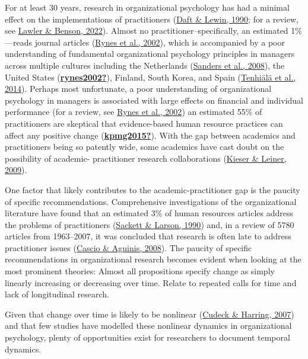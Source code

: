 \documentclass[
12pt, %
twoside,
english]{guelphthesis}
\begin{document}
For at least 30 years, research in organizational psychology has had a minimal effect on the implementations of practitioners (\protect\hyperlink{ref-daft1990}{Daft \& Lewin, 1990}; for a review, see \protect\hyperlink{ref-lawler2022}{Lawler \& Benson, 2022}). Almost no practitioner--specifically, an estimated 1\%---reads journal articles (\protect\hyperlink{ref-rynes2002a}{Rynes et al., 2002}), which is accompanied by a poor understanding of fundamental organizational psychology principles in managers across multiple cultures including the Netherlands (\protect\hyperlink{ref-sanders2008}{Sanders et al., 2008}), the United States (\protect\hyperlink{ref-rynes2002}{\textbf{rynes2002?}}), Finland, South Korea, and Spain (\protect\hyperlink{ref-tenhiuxe4luxe42014}{Tenhiälä et al., 2014}). Perhaps most unfortunate, a poor understanding of organizational psychology in managers is associated with large effects on financial and individual performance (for a review, see \protect\hyperlink{ref-rynes2002b}{Rynes et al., 2002}) an estimated 55\% of practitioners are skeptical that evidence-based human resource practices can affect any positive change (\protect\hyperlink{ref-kpmg2015}{\textbf{kpmg2015?}}). With the gap between academics and practitioners being so patently wide, some academics have cast doubt on the possibility of academic- practitioner research collaborations (\protect\hyperlink{ref-kieser2009}{Kieser \& Leiner, 2009}).

One factor that likely contributes to the academic-practitioner gap is the paucity of specific recommendations. Comprehensive investigations of the organizational literature have found that an estimated 3\% of human resources articles address the problems of practitioners (\protect\hyperlink{ref-sackett1990}{Sackett \& Larson, 1990}) and, in a review of 5780 articles from 1963--2007, it was concluded that research is often late to address practitioner issues (\protect\hyperlink{ref-cascio2008}{Cascio \& Aguinis, 2008}). The paucity of specific recommendations in organizational research becomes evident when looking at the most prominent theories: Almost all propositions specify change as simply linearly increasing or decreasing over time. Relate to repeated calls for time and lack of longitudinal research.




Given that change over time is likely to be nonlinear (\protect\hyperlink{ref-cudeck2007}{Cudeck \& Harring, 2007}) and that few studies have modelled these nonlinear dynamics in organizational psychology, plenty of opportunities exist for researchers to document temporal dynamics.
\end{document}
